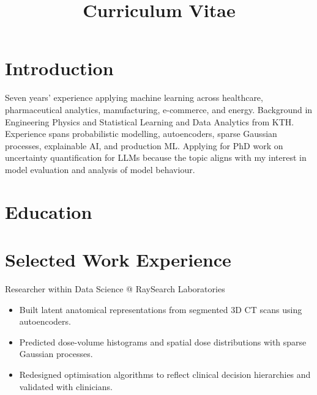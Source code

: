 \documentclass[11pt,a4paper]{moderncv}
\title{Curriculum Vitae}
\begin{document}
\makecvtitle

\section*{Introduction}
Seven years' experience applying machine learning across healthcare, pharmaceutical analytics, manufacturing, e-commerce, and energy. Background in Engineering Physics and Statistical Learning and Data Analytics from KTH. Experience spans probabilistic modelling, autoencoders, sparse Gaussian processes, explainable AI, and production ML. Applying for PhD work on uncertainty quantification for LLMs because the topic aligns with my interest in model evaluation and analysis of model behaviour.

\section{Education}




\section{Selected Work Experience}

\large{Researcher within Data Science @ RaySearch Laboratories}
\normalsize
\begin{itemize}
\item Built latent anatomical representations from segmented 3D CT scans using autoencoders.
\item Predicted dose-volume histograms and spatial dose distributions with sparse Gaussian processes.
\item Redesigned optimisation algorithms to reflect clinical decision hierarchies and validated with clinicians.
\end{itemize}
\end{document}
